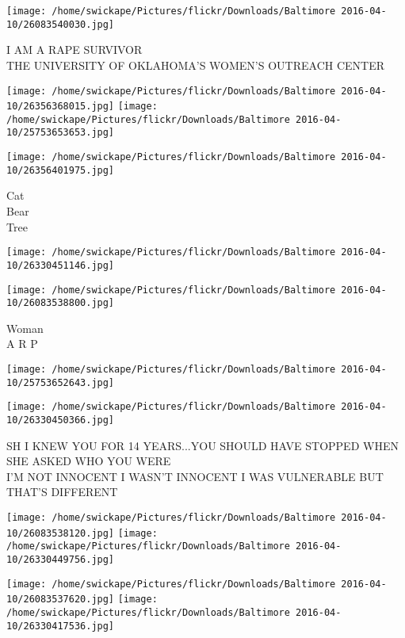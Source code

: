 \documentclass[10pt,letterpaper]{article}
\begin{document}
\vspace{0.25in}
\texttt{[image: /home/swickape/Pictures/flickr/Downloads/Baltimore 2016-04-10/26083540030.jpg]}

I AM A RAPE SURVIVOR\\
THE UNIVERSITY OF OKLAHOMA'S WOMEN'S OUTREACH CENTER
\pagebreak

\texttt{[image: /home/swickape/Pictures/flickr/Downloads/Baltimore 2016-04-10/26356368015.jpg]}
\texttt{[image: /home/swickape/Pictures/flickr/Downloads/Baltimore 2016-04-10/25753653653.jpg]}

\vspace{0.25in}
\texttt{[image: /home/swickape/Pictures/flickr/Downloads/Baltimore 2016-04-10/26356401975.jpg]}

Cat\\
Bear\\
Tree
\pagebreak

\texttt{[image: /home/swickape/Pictures/flickr/Downloads/Baltimore 2016-04-10/26330451146.jpg]}

\vspace{0.25in}
\texttt{[image: /home/swickape/Pictures/flickr/Downloads/Baltimore 2016-04-10/26083538800.jpg]}

Woman\\
A R P
\pagebreak

\texttt{[image: /home/swickape/Pictures/flickr/Downloads/Baltimore 2016-04-10/25753652643.jpg]}

\vspace{0.25in}
\texttt{[image: /home/swickape/Pictures/flickr/Downloads/Baltimore 2016-04-10/26330450366.jpg]}

SH I KNEW YOU FOR 14 YEARS...YOU SHOULD HAVE STOPPED WHEN SHE ASKED WHO YOU WERE\\
I'M NOT INNOCENT I WASN'T INNOCENT I WAS VULNERABLE BUT THAT'S DIFFERENT
\pagebreak

\texttt{[image: /home/swickape/Pictures/flickr/Downloads/Baltimore 2016-04-10/26083538120.jpg]}
\texttt{[image: /home/swickape/Pictures/flickr/Downloads/Baltimore 2016-04-10/26330449756.jpg]}

\texttt{[image: /home/swickape/Pictures/flickr/Downloads/Baltimore 2016-04-10/26083537620.jpg]}
\texttt{[image: /home/swickape/Pictures/flickr/Downloads/Baltimore 2016-04-10/26330417536.jpg]}
\end{document}
